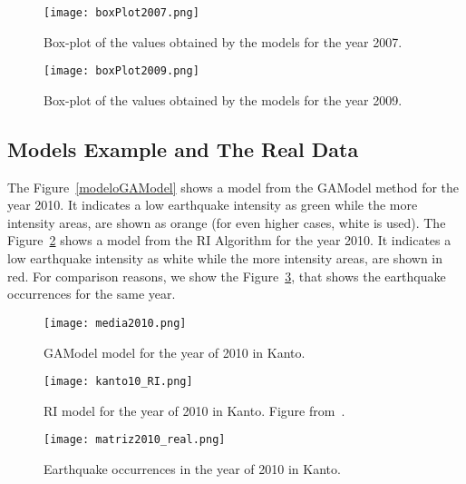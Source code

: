 \begin{figure}[H]
	\centering
	\begin{minipage}{0.45\textwidth}
		\centering
		\texttt{[image: boxPlot2007.png]}
		\caption{Box-plot of the values obtained by the models for the year 2007.}
		\label{boxPlot2007}
	\end{minipage}\hfill
	\begin{minipage}{0.45\textwidth}
		\centering
		\texttt{[image: boxPlot2009.png]}
		\caption{Box-plot of the values obtained by the models for the year 2009.}
		\label{boxPlot2009}
	\end{minipage}
\end{figure}

\subsection{Models Example and The Real Data}

The Figure~\ref{modeloGAModel} shows a model from the GAModel method for the year 2010. It indicates a low earthquake intensity as green while the more intensity areas, are shown as orange (for even higher cases, white is used). The Figure~\ref{modeloRI} shows a model from the RI Algorithm for the year 2010. It indicates a low earthquake intensity as white while the more intensity areas, are shown in red. For comparison reasons, we show the Figure~\ref{realData}, that shows the earthquake occurrences for the same year.\\


\begin{figure}[H]
	\centering
	\begin{minipage}{0.45\textwidth}
		\centering
		\texttt{[image: media2010.png]}
		\caption{ GAModel model for the year of 2010 in Kanto.}
		\label{modeloGAModel}
	\end{minipage}\hfill
	\begin{minipage}{0.45\textwidth}
		\centering
			\texttt{[image: kanto10\_RI.png]}
			\caption{RI model for the year of 2010 in Kanto. Figure from~\cite{ecta14}.}
			\label{modeloRI}
	\end{minipage}
\end{figure}

\begin{figure}[H]
		\centering
		\texttt{[image: matriz2010\_real.png]}
		\caption{Earthquake occurrences in the year of 2010 in Kanto.}
		\label{realData}
\end{figure}


